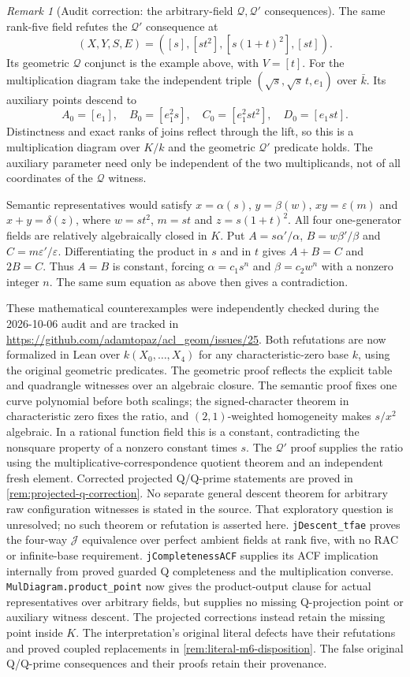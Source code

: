 \documentclass[11pt,oneside]{article}
\theoremstyle{definition}
\theoremstyle{remark}
\newtheorem{remark}[theorem]{Remark}
\newcommand{\Qrel}{\mathcal{Q}}
\newcommand{\Qprel}{\mathcal{Q}'}
\newcommand{\Jrel}{\mathcal{J}}
\newcommand{\lean}[1]{\nolinkurl{#1}}
\begin{document}
\begin{remark}[Audit correction: the arbitrary-field $\Qrel,\Qprel$ consequences]
The same rank-five field refutes the $\Qprel$ consequence at
\[
 (X,Y,S,E)=([s],[st^2],[s(1+t)^2],[st]).
\]
Its geometric $\Qrel$ conjunct is the example above, with $V=[t]$. For the multiplication
diagram take the independent triple $(\sqrt{s},\sqrt{s}\,t,e_1)$ over $\bar k$.
Its auxiliary points descend to
\[
 A_0=[e_1],\quad B_0=[e_1^2s],\quad C_0=[e_1^2st^2],\quad D_0=[e_1st].
\]
Distinctness and exact ranks of joins reflect through the lift, so this is a
multiplication diagram over $K/k$ and the geometric $\Qprel$ predicate holds.
The auxiliary parameter need only be independent of the two multiplicands, not of all
coordinates of the $\Qrel$ witness.

Semantic representatives would satisfy $x=\alpha(s)$, $y=\beta(w)$,
$xy=\varepsilon(m)$ and $x+y=\delta(z)$, where $w=st^2$, $m=st$ and $z=s(1+t)^2$.
All four one-generator fields are relatively algebraically closed in $K$.
Put $A=s\alpha'/\alpha$, $B=w\beta'/\beta$ and $C=m\varepsilon'/\varepsilon$.
Differentiating the product in $s$ and in $t$ gives $A+B=C$ and $2B=C$.
Thus $A=B$ is constant, forcing $\alpha=c_1s^n$ and $\beta=c_2w^n$ with a nonzero integer
$n$. The same sum equation as above then gives a contradiction.

These mathematical counterexamples were independently checked during the 2026-10-06
audit and are tracked in \url{https://github.com/adamtopaz/acl_geom/issues/25}.
Both refutations are now formalized in Lean over $k(X_0,\ldots,X_4)$ for any
characteristic-zero base $k$, using the original geometric predicates. The geometric proof
reflects the explicit table and quadrangle witnesses over an algebraic closure. The semantic
proof fixes one curve polynomial before both scalings; the signed-character theorem in
characteristic zero fixes the ratio, and $(2,1)$-weighted homogeneity makes $s/x^2$
algebraic. In a rational function field this is a constant, contradicting the nonsquare
property of a nonzero constant times $s$. The $\Qprel$ proof supplies the ratio using the
multiplicative-correspondence quotient theorem and an independent fresh element.
Corrected projected Q/Q-prime statements are proved in \cref{rem:projected-q-correction}.
No separate general descent theorem for arbitrary raw configuration witnesses is stated
in the source. That exploratory question is unresolved; no such theorem or refutation is
asserted here.
\lean{jDescent_tfae} proves the four-way $\Jrel$ equivalence over perfect ambient fields
at rank five, with no RAC or infinite-base requirement. \lean{jCompletenessACF} supplies
its ACF implication internally from proved guarded Q completeness and the multiplication
converse. \lean{MulDiagram.product_point} now gives the product-output clause for actual
representatives over arbitrary fields, but supplies no missing Q-projection point or
auxiliary witness descent. The projected corrections instead retain the missing point
inside $K$. The interpretation's original literal defects have their
refutations and proved coupled replacements in \cref{rem:literal-m6-disposition}.
The false original Q/Q-prime consequences and their proofs retain their provenance.
\end{remark}
\end{document}
